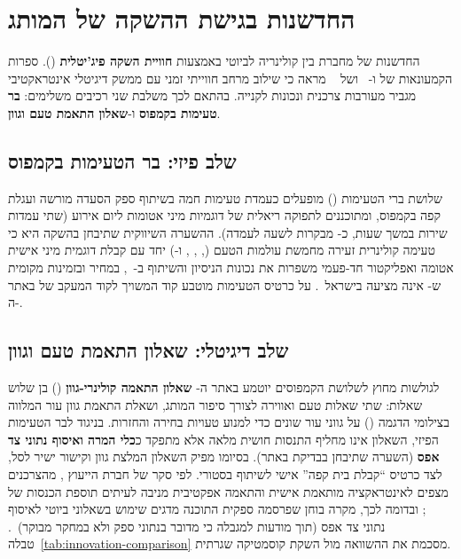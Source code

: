 \section{החדשנות בגישת ההשקה של המותג}
\label{sec:alt-innovation}

החדשנות של  מחברת בין קולינריה לביוטי באמצעות \textbf{חוויית השקה
פיג'יטלית} (). ספרות הקמעונאות של 
ו-~\cite{alexander2025phygital} ושל ~\cite{banik2021phygital}
מראה כי שילוב מרחב חווייתי זמני עם ממשק דיגיטלי אינטראקטיבי מגביר מעורבות
צרכנית ונכונות לקנייה. בהתאם לכך משלבת  שני רכיבים משלימים: \textbf{בר
טעימות בקמפוס} ו-\textbf{שאלון התאמת טעם וגוון}.

\subsection{שלב פיזי: בר הטעימות בקמפוס}
\label{subsec:innov-bar}

שלושת ברי הטעימות () מופעלים כעמדת טעימות חמה בשיתוף
ספק הסעדה מורשה ועגלת קפה בקמפוס, ומתוכננים לתפוקה ריאלית של  דוגמיות
מיני אטומות ליום אירוע (שתי עמדות שירות במשך  שעות, כ- מבקרות
לשעה לעמדה). ההשערה השיווקית שתיבחן בהשקה היא כי טעימה קולינרית זעירה מחמשת
עולמות הטעם (, , ,  ו-) יחד עם קבלת
דוגמית מיני אישית אטומה ואפליקטור חד-פעמי משפרות את נכונות הניסיון והשיתוף
ב-~\cite{voguehk2025food,glossy2025lips}, במחיר ובזמינות מקומית
ש- אינה מציעה בישראל~\cite{rhode2026tint}. על כרטיס הטעימות מוטבע
קוד  המשויך לקוד המעקב של  באתר ה-.

\subsection{שלב דיגיטלי: שאלון התאמת טעם וגוון}
\label{subsec:innov-ai}

לגולשות מחוץ לשלושת הקמפוסים יוטמע באתר ה- \textbf{שאלון התאמה
קולינרי-גוון} () בן שלוש שאלות: שתי שאלות טעם
ואווירה לצורך סיפור המותג, ושאלת התאמת גוון עור המלווה בצילומי הדגמה
() על  גווני עור שונים כדי למנוע טעויות בחירה והחזרות.
בניגוד לבר הטעימות הפיזי, השאלון אינו מחליף התנסות חושית מלאה אלא מתפקד
כ\textbf{כלי המרה ואיסוף נתוני צד אפס} (השערה שתיבחן בבדיקת  באתר).
בסיומו מפיק השאלון המלצת גוון וקישור ישיר לסל, לצד כרטיס ``קבלת בית קפה''
אישי לשיתוף בסטורי. לפי סקר של חברת הייעוץ ,  מהצרכנים
מצפים לאינטראקציה מותאמת אישית והתאמה אפקטיבית מניבה לעיתים תוספת הכנסות של
~\cite{mckinsey2021personalization}; ובדומה לכך, מקרה בוחן
שפרסמה ספקית התוכנה  מדגים שימוש בשאלוני ביוטי לאיסוף נתוני צד
אפס (תוך מודעות למגבלה כי מדובר בנתוני ספק ולא במחקר מבוקר)~\cite{octaneai2025quiz}.
טבלה~\ref{tab:innovation-comparison} מסכמת את ההשוואה מול השקת קוסמטיקה שגרתית.

